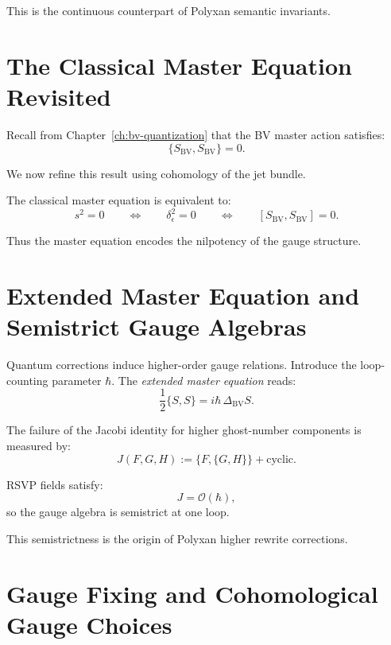 This is the continuous counterpart of Polyxan semantic invariants.

\section{The Classical Master Equation Revisited}

Recall from Chapter~\ref{ch:bv-quantization} that the BV master action
satisfies:
\[
\{S_\mathrm{BV}, S_\mathrm{BV}\} = 0.
\]

We now refine this result using cohomology of the jet bundle.

\begin{theorem}
The classical master equation is equivalent to:
\[
s^2 = 0
\qquad\iff\qquad
\delta_\epsilon^2 = 0
\qquad\iff\qquad
[S_\mathrm{BV}, S_\mathrm{BV}] = 0.
\]
\end{theorem}

Thus the master equation encodes the nilpotency of the gauge structure.

\section{Extended Master Equation and Semistrict Gauge Algebras}

Quantum corrections induce higher-order gauge relations.
Introduce the loop-counting parameter $\hbar$.
The \emph{extended master equation} reads:
\[
\frac{1}{2}\{S, S\} = i\hbar\, \Delta_{\mathrm{BV}} S.
\]

\begin{proposition}
The failure of the Jacobi identity for higher ghost-number components is
measured by:
\[
J(F,G,H) := \{F, \{G,H\}\} + \mathrm{cyclic}.
\]

RSVP fields satisfy:
\[
J = \mathcal{O}(\hbar),
\]
so the gauge algebra is semistrict at one loop.
\end{proposition}

This semistrictness is the origin of Polyxan higher rewrite corrections.

\section{Gauge Fixing and Cohomological Gauge Choices}

